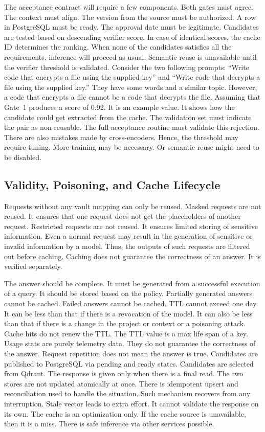 \documentclass{FastFyp}
\begin{document}
The acceptance contract will require a few components.
Both gates must agree.
The context must align.
The version from the source must be authorized.
A row in PostgreSQL must be ready.
The approval date must be legitimate.
Candidates are tested based on descending verifier score.
In case of identical scores, the cache ID determines the ranking.
When none of the candidates satisfies all the requirements, inference will proceed as usual.
Semantic reuse is unavailable until the verifier threshold is validated.
Consider the two following prompts: ``Write code that encrypts a file using the supplied key'' and ``Write code that decrypts a file using the supplied key.''
They have some words and a similar topic.
However, a code that encrypts a file cannot be a code that decrypts the file.
Assuming that Gate~1 produces a score of 0.92.
It is an example value.
It shows how the candidate could get extracted from the cache.
The validation set must indicate the pair as non-reusable.
The full acceptance routine must validate this rejection.
There are also mistakes made by cross-encoders.
Hence, the threshold may require tuning.
More training may be necessary.
Or semantic reuse might need to be disabled.

\subsection{Validity, Poisoning, and Cache Lifecycle}
Requests without any vault mapping can only be reused.
Masked requests are not reused.
It ensures that one request does not get the placeholders of another request.
Restricted requests are not reused.
It ensures limited storing of sensitive information.
Even a normal request may result in the generation of sensitive or invalid information by a model.
Thus, the outputs of such requests are filtered out before caching.
Caching does not guarantee the correctness of an answer.
It is verified separately.

The answer should be complete.
It must be generated from a successful execution of a query.
It should be stored based on the policy.
Partially generated answers cannot be cached.
Failed answers cannot be cached.
TTL cannot exceed one day.
It can be less than that if there is a revocation of the model.
It can also be less than that if there is a change in the project or context or a poisoning attack.
Cache hits do not renew the TTL.
The TTL value is a max life span of a key.
Usage stats are purely telemetry data.
They do not guarantee the correctness of the answer.
Request repetition does not mean the answer is true.
Candidates are published to PostgreSQL via pending and ready states.
Candidates are selected from Qdrant.
The response is given only when there is a final read.
The two stores are not updated atomically at once.
There is idempotent upsert and reconciliation used to handle the situation.
Such mechanism recovers from any interruption.
Stale vector leads to extra effort.
It cannot validate the response on its own.
The cache is an optimization only.
If the cache source is unavailable, then it is a miss.
There is safe inference via other services possible.
\end{document}
